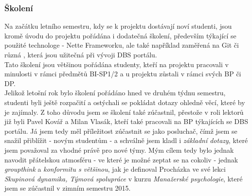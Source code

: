 \subsubsection{Školení}
Na začátku letního semestru, kdy se k projektu dostávají noví studenti, jsou kromě úvodu do projektu pořádána i dodatečná školení, především týkající se použité technologe - Nette Frameworku, ale také například zaměřená na Git či různá , která jsou užitečná při vývoji DBS portálu.\\
Tato školení jsou většinou pořádána studenty, kteří na projektu pracovali v minulosti v rámci předmětů BI-SP1/2 a u projektu zůstali v rámci svých BP či DP.\\
Jelikož letošní rok bylo školení pořádáno hned ve druhém týdnu semestru, studenti byli ještě rozpačití a ostýchali se pokládat dotazy ohledně věcí, které by je zajímaly. Z toho důvodu jsem se školení také zúčastnil, přestože v roli lektorů již byli Pavel Kovář a Milan Vlasák, kteří také pracovali na BP týkajících se DBS portálu. Já jsem tedy měl příležitost zúčastnit se jako posluchač, čímž jsem se snažil přiblížit  - novým studentům - a schválně jsem kladl i \emph{základní dotazy}, které jsem považoval za vhodné právě pro nové týmy. Mým cílem tedy bylo jednak navodit přátelskou atmosféru - ve které je možné zeptat se na cokoliv - jednak  \emph{groupthink} a \emph{konformitu s většinou}, jak je definoval Procházka \cite{prochazka} ve své lekci \emph{Skupinová dynamika, Týmová spolupráce} v kurzu \emph{Manažerské psychologie}, které jsem se zúčastnil v zimním semestru 2015.

